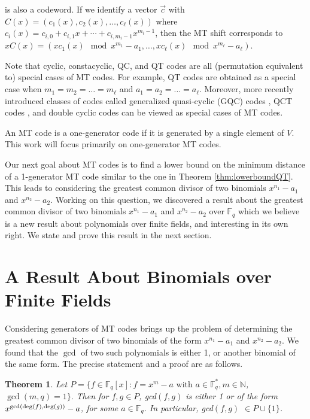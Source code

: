 \documentclass[preprint,12pt]{elsarticle}
\newtheorem{Theorem}{Theorem}[section]
\newcommand{\Fq}{\mathbb{F}_q}
\begin{document}
\noindent is also a codeword. If we identify a vector $\vec{c}$ with $C(x)=(c_1(x),c_2(x),\dots,c_{\ell}(x))$ where $c_i(x)=c_{i,0}+c_{i,1}x+\cdots+c_{i,m_i-1}x^{m_i-1}$, then the MT shift corresponds to $xC(x)=(xc_1(x) \mod x^{m_1}-a_1, \dots, xc_{\ell}(x) \mod x^{m_{\ell}}-a_{\ell})$.

Note that cyclic, constacyclic, QC, and QT  codes are all (permutation equivalent to) special cases of MT codes. For example, QT codes are obtained as a special case when 
$m_1=m_2=\dots=m_{\ell}$ and $a_1=a_2=\dots=a_{\ell}$. Moreover, more recently introduced classes of codes called generalized quasi-cyclic (GQC) codes \cite{gqc}, QCT codes \cite{qct}, and double cyclic codes \cite{dc1,dc2} can be viewed as special cases of MT codes. 

 An MT code is a one-generator code if it is generated by a single element of $V$. This work will focus primarily on one-generator MT codes.

Our next goal about MT codes is to find a lower bound on the minimum distance of a 1-generator MT code similar to the one in Theorem \ref{thm:lowerboundQT}. This leads to considering the greatest common divisor of two binomials $x^{n_1}-a_1$ and $x^{n_2}-a_2$. Working on this question, we discovered a result about the greatest common divisor of two binomials $x^{n_1}-a_1$ and $x^{n_2}-a_2$ over $\Fq$ which we believe is a new result about polynomials over finite fields, and interesting in its own right. We state and prove this result in the next section.


\section{A Result About Binomials over Finite Fields}

Considering generators of MT codes brings up the problem of determining the greatest common divisor of two binomials of the form $x^{n_1}-a_1$ and $x^{n_2}-a_2$. We found that the $\gcd$ of two such polynomials is either 1, or another binomial of the same form. The precise statement and a proof are as follows. 

\begin{Theorem}\label{gcd}
Let $P=\{f\in \mathbb{F}_q[x]: f=x^m-a \text{~with~} a\in \mathbb{F}_q^{\ast}, m\in\mathbb{N}$, $\gcd(m,q)=1\}.$ Then for $f,g\in P$, {\rm gcd}$(f,g)$ is either 1 or of the form $x^{{\rm gcd}({\rm deg}(f),{\rm deg}(g))}-a$, for some $a\in \mathbb{F}_q$. In particular, {\rm gcd}$(f,g)$ $\in P\cup\{1\}$.
\end{Theorem}
\end{document}
